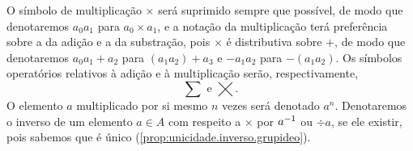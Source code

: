 \begin{notation}
O símbolo de multiplicação $\times$ será suprimido sempre que possível, de modo que denotaremos $a_0a_1$ para $a_0 \times a_1$, e a notação da multiplicação terá preferência sobre a da adição e a da substração, pois $\times$ é distributiva sobre $+$, de modo que denotaremos $a_0a_1 + a_2$ para $(a_1a_2) + a_3$ e $-a_1a_2$ para $-(a_1a_2)$. Os símbolos operatórios relativos à adição e à multiplicação serão, respectivamente,
	\begin{equation*}
	\sum \text{\ \ e\ \ } \bigtimes.
	\end{equation*}
O elemento $a$ multiplicado por si mesmo $n$ vezes será denotado $a^n$. Denotaremos o inverso de um elemento $a \in A$ com respeito a $\times$ por $a^{-1}$ ou $\div a$, se ele existir, pois sabemos que é único (\ref{prop:unicidade.inverso.grupideo}).
\end{notation}


